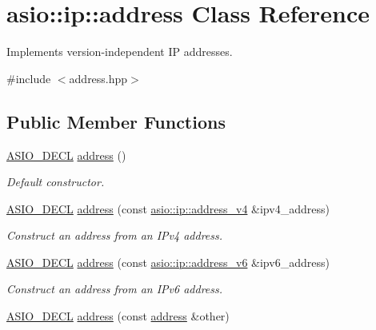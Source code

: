 \hypertarget{classasio_1_1ip_1_1address}{}\section{asio\+:\+:ip\+:\+:address Class Reference}
\label{classasio_1_1ip_1_1address}


Implements version-\/independent I\+P addresses.  




{\ttfamily \#include $<$address.\+hpp$>$}

\subsection*{Public Member Functions}
\begin{DoxyCompactItemize}
\item 
\hyperlink{config_8hpp_ab54d01ea04afeb9a8b39cfac467656b7}{A\+S\+I\+O\+\_\+\+D\+E\+C\+L} \hyperlink{classasio_1_1ip_1_1address_af8a9f7caf9889878c132530ef394b2f2}{address} ()
\begin{DoxyCompactList}\small\item\em Default constructor. \end{DoxyCompactList}\item 
\hyperlink{config_8hpp_ab54d01ea04afeb9a8b39cfac467656b7}{A\+S\+I\+O\+\_\+\+D\+E\+C\+L} \hyperlink{classasio_1_1ip_1_1address_a2893b925b25fdabe32b33eed35668945}{address} (const \hyperlink{classasio_1_1ip_1_1address__v4}{asio\+::ip\+::address\+\_\+v4} \&ipv4\+\_\+address)
\begin{DoxyCompactList}\small\item\em Construct an address from an I\+Pv4 address. \end{DoxyCompactList}\item 
\hyperlink{config_8hpp_ab54d01ea04afeb9a8b39cfac467656b7}{A\+S\+I\+O\+\_\+\+D\+E\+C\+L} \hyperlink{classasio_1_1ip_1_1address_a1fb3143c77eea569d63fb44911c713c8}{address} (const \hyperlink{classasio_1_1ip_1_1address__v6}{asio\+::ip\+::address\+\_\+v6} \&ipv6\+\_\+address)
\begin{DoxyCompactList}\small\item\em Construct an address from an I\+Pv6 address. \end{DoxyCompactList}\item 
\hyperlink{config_8hpp_ab54d01ea04afeb9a8b39cfac467656b7}{A\+S\+I\+O\+\_\+\+D\+E\+C\+L} \hyperlink{classasio_1_1ip_1_1address_a4210e20ec0d7883ae021f32f82e1c8bc}{address} (const \hyperlink{classasio_1_1ip_1_1address}{address} \&other)

\end{DoxyCompactItemize}
